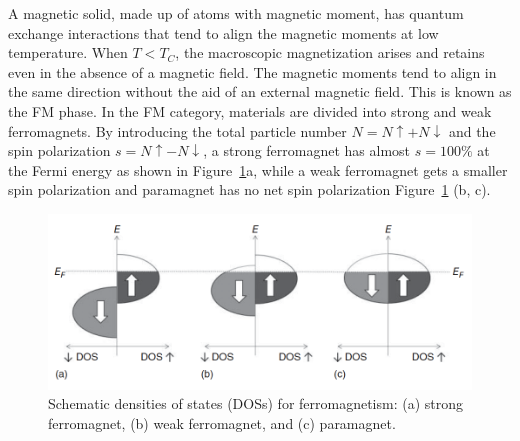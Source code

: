 A magnetic solid, made up of atoms with magnetic moment, has quantum exchange interactions that tend to align the magnetic moments at low temperature. When $T <T_C$, the macroscopic magnetization arises and retains even in the absence of a magnetic field. The magnetic moments tend to align in the same direction without the aid of an external magnetic field.
This is known as the FM phase. In the FM category, materials are divided into strong and weak ferromagnets.
By introducing the total particle number $N=N\uparrow+N\downarrow$ and the spin polarization $s=N\uparrow-N\downarrow$, a strong ferromagnet has almost $s = 100\%$ at the Fermi energy as shown in Figure~\ref{fig:dos}a, while a weak ferromagnet gets a smaller spin polarization and paramagnet has no net spin polarization Figure~\ref{fig:dos}  (b, c).

\begin{figure}[H]
\centering
\captionsetup{justification=centering,margin=2cm}
	\includegraphics[width=130mm]{fig/review/dos.png}
	\caption[Schematic densities of states (DOSs) for ferromagnetism.]{Schematic densities of states (DOSs) for ferromagnetism: (a) strong ferromagnet, (b) weak ferromagnet, and (c) paramagnet.}
\label{fig:dos}
\end{figure}

